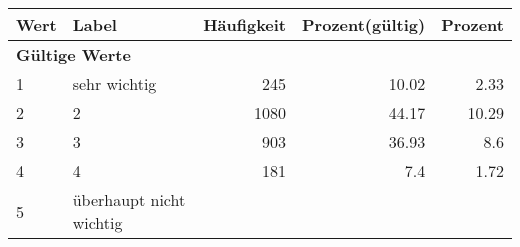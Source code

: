      \begin{longtable}{lXrrr}
     \toprule
     \textbf{Wert} & \textbf{Label} & \textbf{Häufigkeit} & \textbf{Prozent(gültig)} & \textbf{Prozent} \\
     \endhead
     \midrule
     \multicolumn{5}{l}{\textbf{Gültige Werte}}\\

     1 &
     \multicolumn{1}{X}{ sehr wichtig   } &


       \num{245} &
       \num[round-mode=places,round-precision=2]{10,02} &
         \num[round-mode=places,round-precision=2]{2,33} \\

     2 &
     \multicolumn{1}{X}{ 2   } &


       \num{1080} &
       \num[round-mode=places,round-precision=2]{44,17} &
         \num[round-mode=places,round-precision=2]{10,29} \\

     3 &
     \multicolumn{1}{X}{ 3   } &


       \num{903} &
       \num[round-mode=places,round-precision=2]{36,93} &
         \num[round-mode=places,round-precision=2]{8,6} \\

     4 &
     \multicolumn{1}{X}{ 4   } &


       \num{181} &
       \num[round-mode=places,round-precision=2]{7,4} &
         \num[round-mode=places,round-precision=2]{1,72} \\

     5 &
     \multicolumn{1}{X}{ überhaupt nicht wichtig   } &



\end{longtable}
